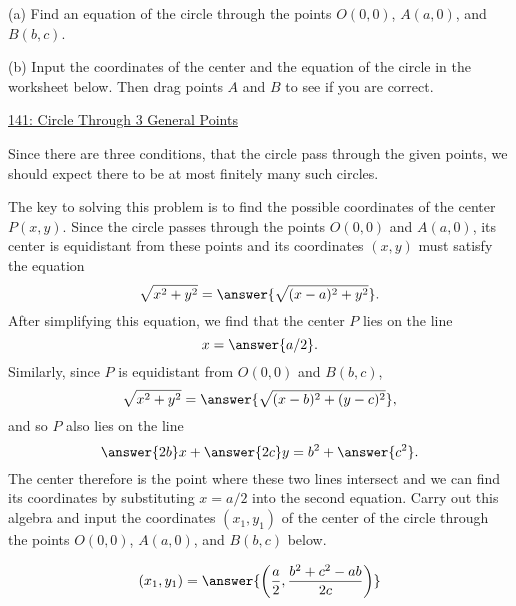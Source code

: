 \documentclass{ximera}
\begin{document}
\begin{question}  \label{Ex7sdfsdf}
(a) Find an equation of the circle through the points $O(0,0)$, $A(a,0)$, and $B(b,c)$. 

(b) Input the coordinates of the center and the equation of the circle in the worksheet below. Then drag points $A$ and $B$ to see if you are correct.

\begin{onlineOnly}
    \begin{center}
\end{center}
\end{onlineOnly}

\href{https://www.desmos.com/calculator/op1ebkzx9n}{141: Circle Through 3 General Points}


\begin{hint}
Since there are three conditions, that the circle pass through the given points, we should expect there to be at most finitely many such circles. 

The key to solving this problem is to find the possible coordinates of the center $P(x,y)$. Since the circle passes through the points $O(0,0)$ and $A(a,0)$, its center is equidistant from these points and its coordinates $(x,y)$ must satisfy the equation
\[
    \sqrt{x^2 + y^2} = \answer{\sqrt{(x-a)^2+y^2}} .
\]
After simplifying this equation, we find that the center $P$ lies on the line  
\[
   x = \answer{a/2}.
\]
Similarly, since $P$ is equidistant from $O(0,0)$ and $B(b,c)$,
\[
  \sqrt{x^2 + y^2} = \answer{\sqrt{(x-b)^2+(y-c)^2}} ,
\]
and so $P$ also lies on the line 
\[
  \answer{2b}x + \answer{2c}y = b^2 + \answer{c^2} .
\]
The center therefore is the point where these two lines intersect and we can find its coordinates by substituting $x=a/2$ into the second equation. Carry out this algebra and input the coordinates $(x_1,y_1)$ of the center of the circle through the points $O(0,0)$, $A(a,0)$, and $B(b,c)$ below.

\[
  (x_1, y_1) = \answer{ \left( \frac{a}{2}  ,  \frac{b^2+c^2-ab}{2c}   \right)} 
\]

\end{hint}

\end{question}






\end{document}
